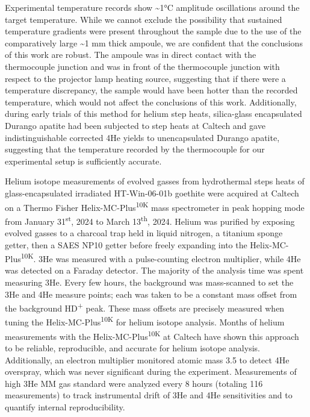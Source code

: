Experimental temperature records show \textasciitilde1°C amplitude
oscillations around the target temperature. While we cannot exclude the
possibility that sustained temperature gradients were present throughout
the sample due to the use of the comparatively large \textasciitilde1 mm
thick ampoule, we are confident that the conclusions of this work are
robust. The ampoule was in direct contact with the thermocouple junction
and was in front of the thermocouple junction with respect to the projector
lamp heating source, suggesting that if there were a temperature
discrepancy, the sample would have been hotter than the recorded
temperature, which would not affect the conclusions of this work.
Additionally, during early trials of this method for helium step heats,
silica-glass encapsulated Durango apatite had been subjected to step
heats at Caltech and gave indistinguishable corrected 4He yields to
unencapsulated Durango apatite, suggesting that the temperature recorded
by the thermocouple for our experimental setup is sufficiently accurate.

Helium isotope measurements of evolved gasses from hydrothermal steps
heats of glass-encapsulated irradiated HT-Win-06-01b goethite were
acquired at Caltech on a Thermo Fisher
Helix-MC-Plus\textsuperscript{10K} mass spectrometer in peak hopping
mode from January 31\textsuperscript{st}, 2024 to March
13\textsuperscript{th}, 2024. Helium was purified by exposing evolved
gasses to a charcoal trap held in liquid nitrogen, a titanium sponge
getter, then a SAES NP10 getter before freely expanding into the
Helix-MC-Plus\textsuperscript{10K}. 3He was measured with a
pulse-counting electron multiplier, while 4He was detected on a Faraday
detector. The majority of the analysis time was spent measuring 3He.
Every few hours, the background was mass-scanned to set the 3He and 4He
measure points; each was taken to be a constant mass offset from the
background HD\textsuperscript{+} peak. These mass offsets are precisely
measured when tuning the Helix-MC-Plus\textsuperscript{10K} for helium
isotope analysis. Months of helium measurements with the
Helix-MC-Plus\textsuperscript{10K} at Caltech have shown this approach to
be reliable, reproducible, and accurate for helium isotope analysis.
Additionally, an electron multiplier monitored atomic mass 3.5 to detect
4He overspray, which was never significant during the experiment.
Measurements of high 3He MM gas standard were analyzed every 8 hours
(totaling 116 measurements) to track instrumental drift of 3He and 4He
sensitivities and to quantify internal reproducibility.

